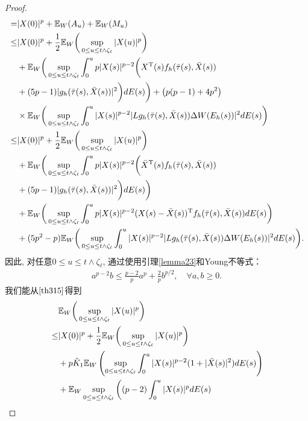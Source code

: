 \begin{proof}
\begin{align}
    =&|X(0)|^p+\mathbb{E}_W(A_u)+\mathbb{E}_W(M_u) \nonumber\\ \nonumber
    \leq& |X(0)|^p+\frac{1}{2}\mathbb{E}_W\bigg(\sup_{0\leq u\leq t\wedge \zeta_{\ell}}|X(u)|^p\bigg) \\ \nonumber
    \quad&+\mathbb{E}_W\bigg(\sup_{0\leq u\leq t\wedge \zeta_{\ell}}\int_{0}^{u}p |X(s)|^{p-2}\bigg(X^{\mathrm{T}}(s)f_{h}(\bar{\tau}(s),\bar{X}(s)) \\ \nonumber
    \quad&+(5p-1)|g_{h}(\bar{\tau}(s),\bar{X}(s))|^2\bigg)dE(s)\bigg)
    +\big(p(p-1)+4p^{2}\big) \\ \nonumber
    \quad& \times \mathbb{E}_W\bigg(\sup_{0\leq u\leq t\wedge\zeta_{\ell}}\int_{0}^{u}|X(s)|^{p-2}|Lg_{h}(\bar{\tau}(s),\bar{X}(s)) \Delta W(E_{h}(s))|^2dE(s)\bigg) \\ \nonumber
    \leq& |X(0)|^p+\frac{1}{2}\mathbb{E}_W\bigg(\sup_{0\leq u\leq t\wedge \zeta_{\ell}}|X(u)|^p\bigg) \\ \nonumber
    \quad&+\mathbb{E}_W\bigg(\sup_{0\leq u\leq t\wedge \zeta_{\ell}}\int_{0}^{u}p|X(s)|^{p-2} \bigg(\bar{X}^{\mathrm{T}}(s)f_{h}(\bar{\tau}(s),\bar{X}(s)) \\ \nonumber
    \quad&+(5p-1)|g_{h}(\bar{\tau}(s),\bar{X}(s))|^2\bigg)dE(s)\bigg) \\ \nonumber
    \quad& +\mathbb{E}_W\bigg(\sup_{0\leq u\leq t\wedge \zeta_{\ell}}\int_{0}^{u}p|X(s)|^{p-2}(X(s)-\bar{X}(s))^{\mathrm{T}}f_{h}(\bar{\tau}(s),\bar{X}(s))dE(s)\bigg) \\ \nonumber
    \quad& 
    +(5p^{2}-p) \mathbb{E}_W\bigg(\sup_{0\leq u\leq t\wedge \zeta_{\ell}}\int_{0}^{u}|X(s)|^{p-2}|Lg_{h}(\bar{\tau}(s),\bar{X}(s))\Delta W(E_{h}(s))|^2dE(s)\bigg).\nonumber \\ 
\end{align}
因此, 对任意$0\leq u\leq t\wedge \zeta_{\ell}$, 通过使用引理\ref{lemma23}和Young不等式：
\begin{align*}
    a^{p-2}b\leq \frac{p-2}{p}a^p + \frac{2}{p}b^{p/2},\quad \forall a,b \geq 0.
\end{align*}
我们能从$\eqref{th315}$得到
 \begin{align*}
    \label{e316}
    &\EE_W\bigg(\sup_{0\leq u\leq t\wedge \zeta_{\ell}}|X(u)|^p\bigg)\\
    \leq& |X(0)|^p+\frac{1}{2}\EE_W\bigg(\sup_{0\leq u\leq t\wedge \zeta_{\ell}}|X(u)|^p\bigg)\\
    \quad&+p\hat{K}_1\EE_W\left(\sup_{0\leq u\leq t\wedge \zeta_{\ell}}\int_{0}^{u}{|X(s)|^{p-2}(1+|\bar{X}(s)|^2)dE(s)}\right)\\
    \quad& +\EE_W\sup_{0\leq u\leq t\wedge \zeta_{\ell}}\bigg((p-2)\int_{0}^{u}{|X(s)|^p dE(s)}\\

\end{align*}
\end{proof}
